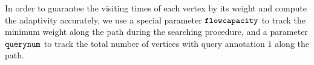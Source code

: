 In order to guarantee the visiting times of each vertex by its weight
 and compute the adaptivity accurately, 
 we use a special parameter $\mathtt{flowcapacity}$  to track the minimum weight
 along the path during the 
 searching procedure, 
 and a parameter $\mathtt{querynum}$
 to track the total number of vertices with query annotation $1$
 along the path.
 
